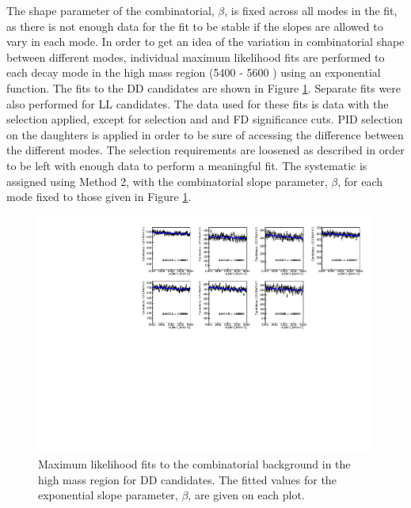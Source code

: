 The shape parameter of the combinatorial, $\beta$, is fixed across all \Dz modes in the \CP fit, as there is not enough data for the fit to be stable if the slopes are allowed to vary in each mode. In order to get an idea of the variation in combinatorial shape between different \Dz modes, individual maximum likelihood fits are performed to each \Dz decay mode in the high \Bm mass region (5400 - 5600 \mevcc) using an exponential function. The fits to the DD candidates are shown in Figure \ref{combinatoricDD}. Separate fits were also performed for LL candidates. The data used for these fits is \runone data with the selection applied, except for \Kstar selection and \Dz and \KS FD significance cuts. PID selection on the \Dz daughters is applied in order to be sure of accessing the difference between the different \Dz modes. The selection requirements are loosened as described in order to be left with enough data to perform a meaningful fit. The systematic is assigned using Method 2, with the combinatorial slope parameter, $\beta$, for each \Dz mode fixed to those given in Figure \ref{combinatoricDD}.


\begin{figure}[h]
\centering
\includegraphics[width=\linewidth]{figures/fitComponents/combinatoricFits_DD.pdf}
\caption{Maximum likelihood fits to the combinatorial background in the high \Bm mass region for DD candidates. The fitted values for the exponential slope parameter, $\beta$, are given on each plot.}
\label{combinatoricDD}
\end{figure}



